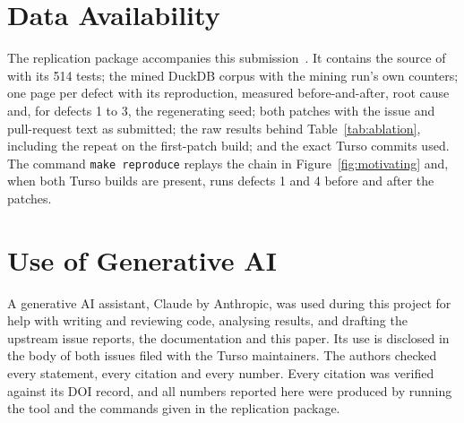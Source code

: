 \section*{Data Availability}
\label{sec:data}
The replication package accompanies this submission~\cite{graftrepo}. It contains the source of
\tool with its 514 tests; the mined DuckDB corpus with the mining run's own
counters; one page per defect with its reproduction, measured before-and-after,
root cause and, for defects 1 to 3, the regenerating seed; both patches with the
issue and pull-request text as submitted; the raw results behind
Table~\ref{tab:ablation}, including the repeat on the first-patch build; and the
exact Turso commits used. The command \texttt{make reproduce} replays the chain
in Figure~\ref{fig:motivating} and, when both Turso builds are present, runs
defects 1 and 4 before and after the patches.

\section*{Use of Generative AI}
A generative AI assistant, Claude by Anthropic, was used during this project for
help with writing and reviewing code, analysing results, and drafting the
upstream issue reports, the documentation and this paper. Its use is disclosed in
the body of both issues filed with the Turso maintainers. The authors checked
every statement, every citation and every number. Every citation was verified
against its DOI record, and all numbers reported here were produced by running
the tool and the commands given in the replication package.
